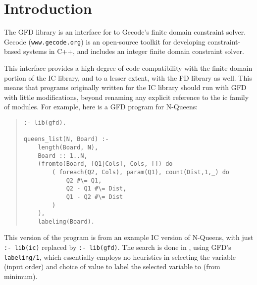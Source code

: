 %
% 
% 
% 
% 


\section{Introduction}

   The GFD library is an interface for {\eclipse} to Gecode's finite domain constraint
   solver. Gecode ({\tt www.gecode.org}) is an open-source toolkit for 
   developing
   constraint-based systems in C++, and includes an  integer 
   finite domain constraint solver.

   This interface provides a high degree of code compatibility with the finite 
   domain portion of the IC library, and to a lesser extent, with the FD
   library as well. This means that programs originally written for the
   IC library should run with GFD with little modifications, beyond 
   renaming any explicit reference to the ic family of modules. For example,
   here is a GFD program for N-Queens:

\begin{quote}
\begin{verbatim}
:- lib(gfd).

queens_list(N, Board) :-
    length(Board, N),
    Board :: 1..N,
    (fromto(Board, [Q1|Cols], Cols, []) do
        ( foreach(Q2, Cols), param(Q1), count(Dist,1,_) do
            Q2 #\= Q1,
            Q2 - Q1 #\= Dist,
            Q1 - Q2 #\= Dist
        )
    ),
    labeling(Board).  
\end{verbatim}
\end{quote}

This version of the program is from an example IC version of N-Queens,
with just \verb':- lib(ic)' replaced by \verb':- lib(gfd)'. The
search is done in \eclipse, using GFD's \verb'labeling/1', which essentially
employs no heuristics in selecting the variable (input order) and choice of 
value to label the selected variable to (from minimum).



